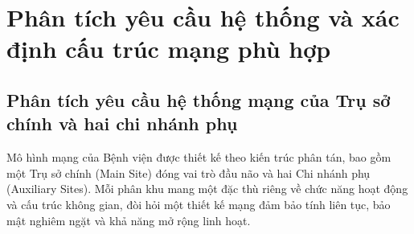 \section{Phân tích yêu cầu hệ thống và xác định cấu trúc mạng phù hợp}

\subsection{Phân tích yêu cầu hệ thống mạng của Trụ sở chính và hai chi nhánh phụ}
Mô hình mạng của Bệnh viện được thiết kế theo kiến trúc phân tán, bao gồm một Trụ sở chính (Main Site) đóng vai trò đầu não và hai Chi nhánh phụ (Auxiliary Sites). Mỗi phân khu mang một đặc thù riêng về chức năng hoạt động và cấu trúc không gian, đòi hỏi một thiết kế mạng đảm bảo tính liên tục, bảo mật nghiêm ngặt và khả năng mở rộng linh hoạt.

